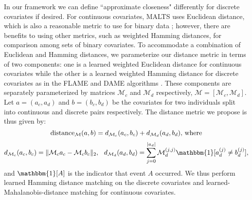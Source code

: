 In our framework we can define ``approximate closeness" differently for discrete covariates if desired. For continuous covariates, MALTS uses Euclidean distance, which is also a reasonable metric to use for binary data  \citep[e.g., Mahalanobis-distance-matching papers recommend converting unordered categorical variables to binary indicators, see][]{stuart2010matching}; however, there are benefits to using other metrics, such as weighted Hamming distances, for comparison among sets of binary covariates. 
%
%
To accommodate a combination of Euclidean and Hamming distances,
we parameterize our distance metric in terms of two components: one is a learned weighted Euclidean distance for continuous covariates while the other is a learned weighted Hamming distance for discrete covariates as in the FLAME and DAME algorithms \citep{wang2017flame, DiengEtAl2018}. These components are separately parameterized by matrices $\mathcal{M}_c$ and $\mathcal{M}_d$ respectively, $\mathcal{M} = \left[\mathcal{M}_c, \mathcal{M}_d\right]$. Let $a = (a_c,a_d)$ and $b = (b_c,b_d)$ be the covariates for two individuals split into continuous and discrete pairs respectively. The distance metric we propose is thus given by:
$$\mathrm{distance}_\mathcal{M}(a,b) = d_{\mathcal{M}_c}(a_c,b_c) + d_{\mathcal{M}_d}(a_d,b_d) \text{, where}$$
  $$d_{\mathcal{M}_c}(a_c,b_c) = \|\mathcal{M}_{c}a_c - \mathcal{M}_{c}b_c\|_{2}, \hspace{0.25 cm}d_{\mathcal{M}_d}(a_d,b_d) = \sum_{j=0}^{|a_d|} \mathcal{M}_d^{(j,j)} \mathbbm{1}[a_d^{(j)}\neq b_d^{(j)}], $$
and $\mathbbm{1}[A]$ is the indicator that event $A$ occurred. 
We thus perform learned Hamming distance matching on the discrete covariates and learned-Mahalanobis-distance matching for continuous covariates. 

